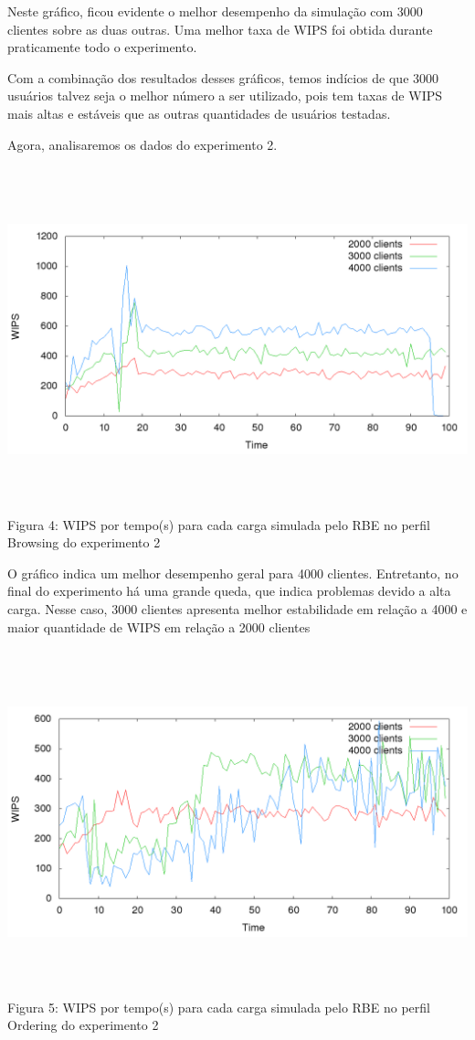 \documentclass[11pt,twoside]{article}
\begin{document}
Neste gráfico, ficou evidente o melhor desempenho da simulação com 3000 clientes sobre as duas outras. Uma melhor taxa de WIPS foi obtida durante praticamente todo o experimento.

Com a combinação dos resultados desses gráficos, temos indícios de que 3000 usuários talvez seja o melhor número a ser utilizado, pois tem taxas de WIPS mais altas e estáveis que as outras quantidades de usuários testadas.

Agora, analisaremos os dados do experimento 2.

\begin{center}
\includegraphics[width=15cm, height=10cm]{images/exp2/plot_browsin}
Figura 4: WIPS por tempo(s) para cada carga simulada pelo RBE no perfil Browsing do experimento 2
\end{center}

O gráfico indica um melhor desempenho geral para 4000 clientes. Entretanto, no final do experimento há uma grande queda, que indica problemas devido a alta carga. Nesse caso, 3000 clientes apresenta melhor estabilidade em relação a 4000 e maior quantidade de WIPS em relação a 2000 clientes

\begin{center}
\includegraphics[width=15cm, height=10cm]{images/exp2/plot_ordering}
Figura 5: WIPS por tempo(s) para cada carga simulada pelo RBE no perfil Ordering do experimento 2
\end{center}
\end{document}
